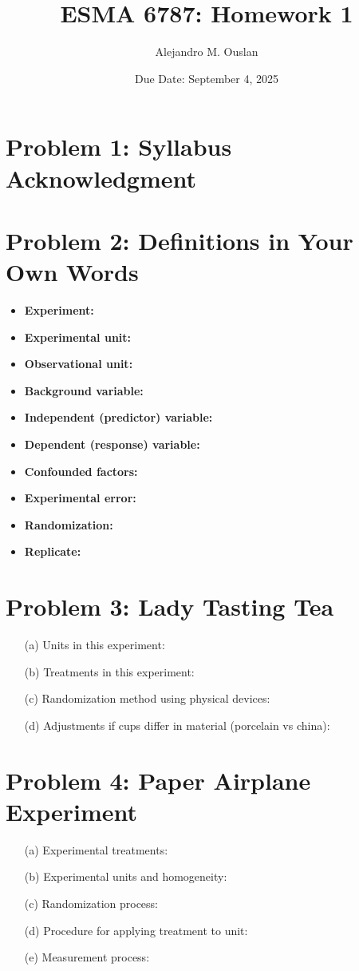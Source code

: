 \documentclass[10pt, oneside]{article}
\title{ESMA 6787: Homework 1}
\author{Alejandro M. Ouslan}
\date{Due Date: September 4, 2025}
\begin{document}
\maketitle

\vspace{.25in}

\section*{Problem 1: Syllabus Acknowledgment}


\section*{Problem 2: Definitions in Your Own Words}
\begin{itemize}
	\item \textbf{Experiment:} 
	\item \textbf{Experimental unit:} 
	\item \textbf{Observational unit:} 
	\item \textbf{Background variable:} 
	\item \textbf{Independent (predictor) variable:} 
	\item \textbf{Dependent (response) variable:} 
	\item \textbf{Confounded factors:} 
	\item \textbf{Experimental error:} 
	\item \textbf{Randomization:} 
	\item \textbf{Replicate:} 
\end{itemize}

\section*{Problem 3: Lady Tasting Tea}
\begin{itemize}
	\item[(a)] Units in this experiment:
	\item[(b)] Treatments in this experiment:
	\item[(c)] Randomization method using physical devices:
	\item[(d)] Adjustments if cups differ in material (porcelain vs china):
\end{itemize}

\section*{Problem 4: Paper Airplane Experiment}
\begin{itemize}
	\item[(a)] Experimental treatments:
	\item[(b)] Experimental units and homogeneity:
	\item[(c)] Randomization process:
	\item[(d)] Procedure for applying treatment to unit:
	\item[(e)] Measurement process:
\end{itemize}
\end{document}
